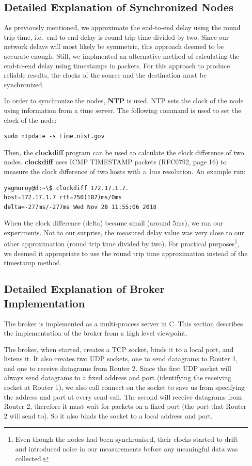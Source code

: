 \documentclass[conference]{IEEEtran}
\begin{document}
\subsection{Detailed Explanation of Synchronized Nodes}
As previously mentioned, we approximate the end-to-end delay using the round trip time, i.e.\
end-to-end delay is round trip time divided by two. Since our network delays will
most likely be symmetric, this approach deemed to be accurate enough. Still,
we implmented an alternative method of calculating the end-to-end delay using
timestamps in packets. For this approach to produce reliable results, the clocks
of the source and the destination must be synchronized.

In order to synchronize the nodes, \textbf{NTP} is used. NTP sets the clock of the
node using information from a time server. The following command is used to set the
clock of the node:
\begin{lstlisting}
sudo ntpdate -s time.nist.gov
\end{lstlisting}
Then, the \textbf{clockdiff} program can be used to calculate the clock difference
of two nodes. \textbf{clockdiff} uses ICMP TIMESTAMP packets (RFC0792, page 16)
to measure the clock difference of two hosts with a 1ms resolution. An example run:
\begin{lstlisting}
yagmuroy@d:~\$ clockdiff 172.17.1.7.
host=172.17.1.7 rtt=750(187)ms/0ms
delta=-277ms/-277ms Wed Nov 28 11:55:06 2018
\end{lstlisting}
When the clock difference (delta) became small (around 5ms), we ran our experiments.
Not to our surprise, the measured delay value was very close to our other approximation
(round trip time divided by two). For practical purposes\footnote{Even though the nodes had been
synchronised, their clocks started to drift and introduced noise in our measurements
before any meaningful data was collected.}, we deemed it appropriate
to use the round trip time approximation instead of the timestamp method.

\subsection{Detailed Explanation of Broker Implementation}
The broker is implemented as a multi-process server in C. This section describes
the implementation of the broker from a high level viewpoint.

The broker, when started, creates a TCP socket, binds it to a local port, and listens
it. It also creates two UDP sockets, one to send datagrams to Router 1, and one to receive
datagrams from Router 2. Since the first UDP socket will always send datagrams to a
fixed address and port (identifying the receiving socket at Router 1), we also
call connect on the socket to save us from specifying the address and port at every send call.
The second will receive datagrams from Router 2, therefore it must wait for packets
on a fixed port (the port that Router 2 will send to). So it also binds the socket
to a local address and port.
\end{document}
